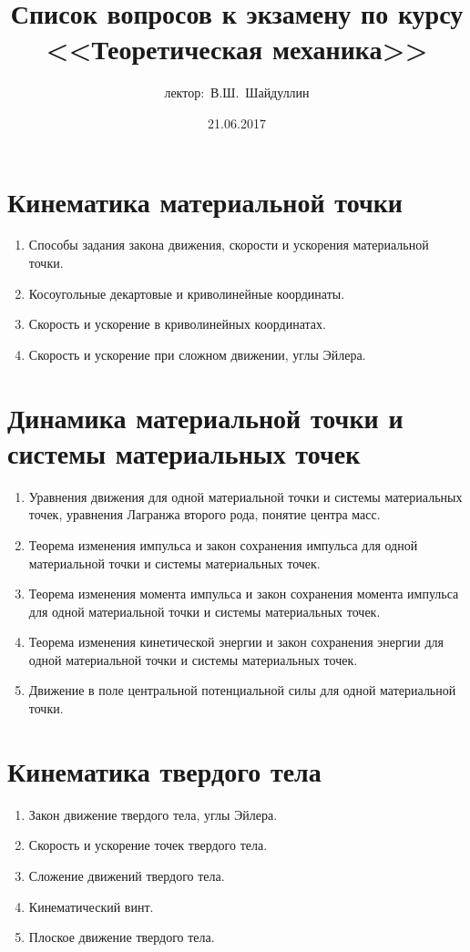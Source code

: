 \documentclass[landscape,10pt]{notes}
\title{Список вопросов к экзамену по курсу
<<Теоретическая механика>>}
\author{лектор:~В.Ш.~Шайдуллин}
\date{21.06.2017}
\begin{document}
\thispagestyle{empty}
\begin{multicols}{2}

  \section{Кинематика материальной точки}
  \begin{enumerate}
    \item Способы задания закона движения, скорости и ускорения материальной точки.
    \item Косоугольные декартовые и криволинейные координаты.
    \item Скорость и ускорение в криволинейных координатах.
    \item Скорость и ускорение при сложном движении, углы Эйлера.
  \end{enumerate}

  \section{Динамика материальной точки и системы материальных точек}
  \begin{enumerate}[resume]
    \item Уравнения движения для одной материальной точки и системы материальных
      точек, уравнения Лагранжа второго рода, понятие центра масс.
    \item Теорема изменения импульса и закон сохранения импульса для одной материальной точки и системы материальных точек.
    \item Теорема изменения момента импульса и закон сохранения момента импульса
      для одной материальной точки и системы материальных точек.
    \item Теорема изменения кинетической энергии и закон сохранения энергии для одной
      материальной точки и системы материальных точек.
    \item Движение в поле центральной потенциальной силы для одной материальной
      точки.
  \end{enumerate}
  \section{Кинематика твердого тела}

  \begin{enumerate}[resume]
    \item Закон движение твердого тела, углы Эйлера.
    \item Скорость и ускорение точек твердого тела.
    \item Сложение движений твердого тела.
    \item Кинематический винт.
    \item Плоское движение твердого тела.
  \end{enumerate}


\end{multicols}
\end{document}
